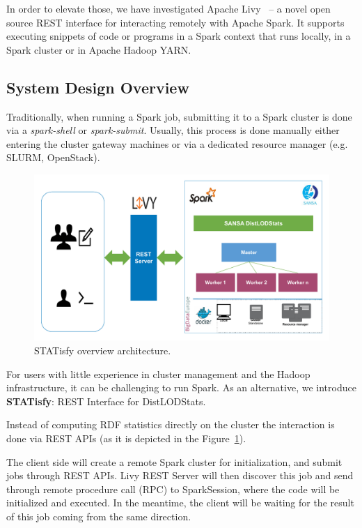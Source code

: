 In order to elevate those, we have investigated Apache Livy~ -- a novel open source REST interface for interacting remotely with Apache Spark. It supports executing snippets of code or programs in a Spark context that runs locally, in a Spark cluster or in Apache Hadoop YARN.

\subsection{System Design Overview}
Traditionally, when running a Spark job, submitting it to a Spark cluster is done via a \textit{spark-shell} or \textit{spark-submit}.
Usually, this process is done manually either entering the cluster gateway  machines  or via a dedicated resource manager (e.g. SLURM, OpenStack). 

\begin{figure}
\centering
\includegraphics[width=1.0\columnwidth]{images/4_distlodstats/distlodstats-statisfy.pdf}
\caption{STATisfy overview architecture.}
\label{fig:STATisfy}
\end{figure}

For users with little experience in cluster management and the Hadoop infrastructure, it can be challenging to run Spark.
As an alternative, we introduce \textbf{STATisfy}: REST Interface for DistLODStats. 

Instead of computing RDF statistics directly on the cluster the interaction is done via REST APIs (as it is depicted in the Figure~\ref{fig:STATisfy}).

The client side will create a remote Spark cluster for initialization, and submit jobs through REST APIs. 
Livy REST Server will then discover this job and send through remote procedure call (RPC) to SparkSession, where the code will be initialized and executed. 
In the meantime, the client will be waiting for the result of this job coming from the same direction.

